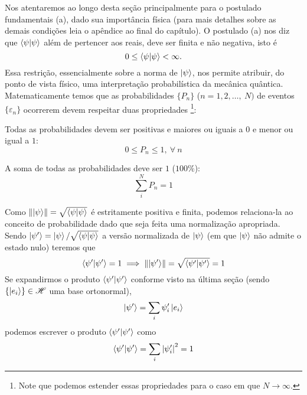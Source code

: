 Nos atentaremos ao longo desta seção principalmente para o postulado fundamentais (a), dado sua importância física (para mais detalhes sobre as demais condições leia o apêndice ao final do capítulo). O postulado (a) nos diz que $\braket{\psi}{\psi}$ além de pertencer aos reais, deve ser finita e não negativa, isto é 
\begin{equation*}
    0 \leq \braket{\psi}{\psi} < \infty. 
\end{equation*}
Essa restrição, essencialmente sobre a norma de $\ket{\psi}$, nos permite atribuir, do ponto de vista físico,  uma interpretação probabilística da mecânica quântica. Matematicamente temos que as probabilidades $\{P_n\}$ ($n =1, 2,\dots, \ N)$ de eventos $\{\varepsilon_n\}$ ocorrerem devem respeitar duas propriedades \footnote{Note que podemos estender essas propriedades para o caso em que $N\to \infty$.}:
\begin{myitemize}
    \item Todas as probabilidades devem ser positivas e maiores ou iguais a $0$ e menor ou igual a $1$:
    \begin{equation*}
        0\leq P_n \leq 1, \ \forall\ n
    \end{equation*}
    \item A soma de todas as probabilidades deve ser $1$ ($100\%$):
    \begin{equation*}
        \sum_i^{N}P_n = 1
    \end{equation*}
\end{myitemize}
Como $\norm{\ket{\psi}} = \sqrt{\braket{\psi}{\psi}}$ é estritamente positiva e finita, podemos relaciona-la ao conceito de probabilidade dado que seja feita uma normalização apropriada. Sendo $\ket{\psi^\prime} = \ket{\psi}/\sqrt{\braket{\psi}{\psi}}$ a versão normalizada de $\ket{\psi}$ (em que $\ket{\psi}$ não admite o estado nulo) teremos que
\begin{equation*}
    \braket{\psi'}{\psi'} = 1 \implies \norm{\ket{\psi^\prime}}= \sqrt{\braket{\psi^\prime}{\psi^\prime}} = 1
\end{equation*}
Se expandirmos o produto $\braket{\psi'}{\psi'}$ conforme visto na última seção (sendo $\{\ket{e_i}\}\in \mathscr{H}$ uma base ortonormal),
\begin{equation*}
    \ket{\psi'} = \sum_{i}\psi_{i}'\ket{e_{i}}
\end{equation*}
podemos escrever o produto $\braket{\psi'}{\psi'}$ como
\begin{equation*}
    \braket{\psi'}{\psi'} = \sum_i \abs{\psi_i'}^2 = 1
\end{equation*}
